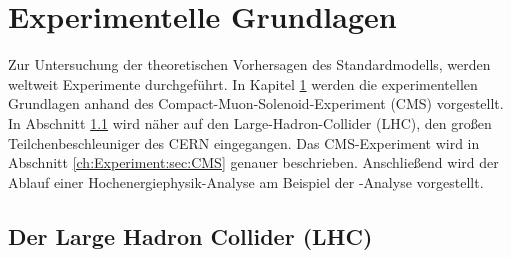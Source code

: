 \chapter{Experimentelle Grundlagen}
\label{ch:experiment}

{}	%

Zur Untersuchung der theoretischen Vorhersagen des Standardmodells, werden weltweit Experimente durchgef\"uhrt. In Kapitel \ref{ch:experiment} werden die experimentellen Grundlagen anhand des Compact-Muon-Solenoid-Experiment (CMS) vorgestellt. In Abschnitt \ref{ch:Experiment:sec:LHC} wird n\"aher auf den Large-Hadron-Collider (LHC), den gro\ss en Teilchenbeschleuniger des CERN eingegangen. Das CMS-Experiment wird in Abschnitt \ref{ch:Experiment:sec:CMS} genauer beschrieben.%
Anschlie\ss end wird der Ablauf einer Hochenergiephysik-Analyse am Beispiel der \ttH-Analyse vorgestellt.

\section{Der Large Hadron Collider (LHC)}
\label{ch:Experiment:sec:LHC}

